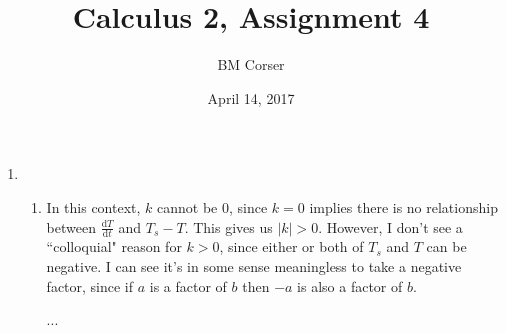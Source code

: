 \documentclass[10pt]{article}
\author{BM Corser}
\title{Calculus 2, Assignment 4}
\date{April 14, 2017}
\newcommand*{\dTdt}[0]{\frac{\text{d}T}{\text{d}t}}
\begin{document}
    \maketitle 
    \begin{enumerate}
        \item 
        \begin{enumerate}
            \item In this context, $k$ cannot be 0, since $k = 0$ implies there
                is no relationship between $\dTdt$ and $T_s - T$. This gives us
                $|k| > 0$. However, I don't see a ``colloquial" reason for $k >
                0$, since either or both of $T_s$ and $T$ can be negative. I
                can see it's in some sense meaningless to take a negative
                factor, since if $a$ is a factor of $b$ then $-a$ is also a
                factor of $b$.

                ...


\end{enumerate}
\end{enumerate}
\end{document}
